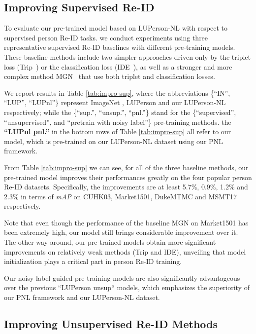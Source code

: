 \documentclass[10pt,twocolumn,letterpaper]{article}
\begin{document}
\subsection{Improving Supervised Re-ID}


To evaluate our pre-trained model based on LUPerson-NL with respect to supervised person Re-ID tasks.
we conduct experiments using three representative supervised Re-ID baselines with different pre-training models. 
These baseline methods include two simpler approaches driven only by the triplet loss (Trip~\cite{hermans2017defense}) or the classification loss (IDE~\cite{zheng2017person}), as well as a stronger and more complex method MGN~\cite{wang2018learning} that use both triplet and classification losses.

We report results in Table \ref{tab:impro-sup}, where the abbreviations \{``IN'', ``LUP'', ``LUPnl''\} represent ImageNet \cite{russakovsky2015imagenet}, LUPerson \cite{fu2020unsupervised} and our LUPerson-NL respectively; while the \{``sup.'', ``unsup.'', ``pnl.''\} stand for the \{``supervised'', ``unsupervised'', and ``pretrain with noisy label''\} pre-training methods. \eg the \textbf{``LUPnl pnl.''} in the bottom rows of Table \ref{tab:impro-sup} all refer to our model, which is pre-trained on our LUPerson-NL dataset using our PNL framework.

From Table \ref{tab:impro-sup} we can see, for all of the three baseline methods, our pre-trained model improves their performances greatly on the four popular person Re-ID datasets. Specifically, the improvements are at least 5.7\%, 0.9\%, 1.2\% and 2.3\% in terms of \emph{mAP} on CUHK03, Market1501, DukeMTMC and MSMT17 respectively. 

Note that even though the performance of the baseline MGN on Market1501 has been extremely high, our model still brings considerable improvement over it.
The other way around, our pre-trained models obtain more significant improvements on relatively weak methods (Trip and IDE),
unveiling that model initialization plays a critical part in person Re-ID training.

Our noisy label guided pre-training models are also significantly advantageous over the previous {``LUPerson unsup``} models, which emphasizes the superiority of our PNL framework and our LUPerson-NL dataset.  

\subsection{Improving Unsupervised Re-ID Methods}
\end{document}
